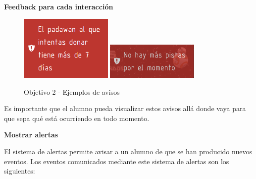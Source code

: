
\textbf{Feedback para cada interacción}
\begin{figure}[ht]
	\centering
	\includegraphics[width=0.4\textwidth]{imagenes/Objetivo2_new.png}
	\includegraphics[width=0.4\textwidth]{imagenes/Objetivo2b_new.png}
	\caption{Objetivo 2 - Ejemplos de avisos}
	\label{objetivoIm2}
\end{figure}

Es importante que el alumno pueda visualizar estos avisos allá donde vaya para que sepa qué está ocurriendo en todo momento.

\textbf{Mostrar alertas}

El sistema de alertas permite avisar a un alumno de que se han producido nuevos eventos. Los eventos comunicados mediante este sistema de alertas son los siguientes:\\

